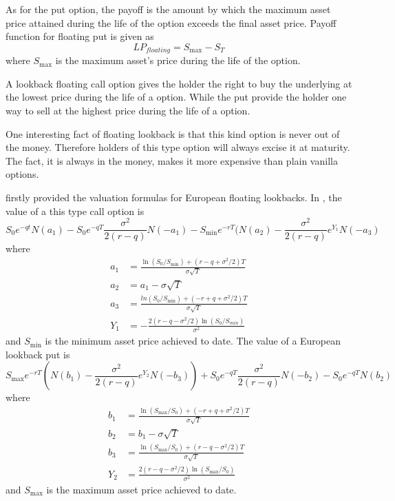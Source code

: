 \documentclass[11pt]{book}
\begin{document}
As for the put option, the payoff is the amount by which the maximum asset price attained during the life of the option exceeds the final asset price. Payoff function for floating put is given as
\begin{equation}
LP_{floating}=S_{\max}-S_T
\end{equation}
where $S_{\max}$ is the maximum asset's price during the life of the option. 

A lookback floating call option gives the holder the right to buy the underlying at the lowest price during the life of a option. While the put provide the holder one way to sell at the highest price during the life of a option. 

One interesting fact of floating lookback is that this kind option is never out of the money. Therefore holders of this type option will always excise it at maturity. The fact, it is always in the money, makes it more expensive than plain vanilla options. 

\cite{Goldman1979} firstly provided the valuation formulas for European floating lookbacks. In \cite{Hull2008}, the value of a this type call option is
\begin{equation}\label{eq:3}
S_0e^{-qt}N(a_1) - S_0 e^{-qT}\frac{\sigma ^2}{2(r-q)} N(-a_1) - S_{\min} e^{-rT}(N(a_2) - \frac{\sigma^2}{2(r-q)} e ^{Y_1} N(-a_3)
\end{equation}
where
\begin{equation}\label{eq:4}
\begin{split}
a_1 &=\frac{\ln(S_0 / S_{\min}) + (r-q+\sigma^2 /2)T}{\sigma \sqrt{T}}\\
a_2 &= a_1 - \sigma \sqrt{T}\\
a_3 &= \frac{ln(S_0 / S_{\min})+ (-r+q+\sigma^2 / 2)T}{\sigma \sqrt{T}}\\
Y_1 &= - \frac{2(r-q-\sigma^2 / 2) \ln(S_0 / S_{min})}{\sigma^2}
\end{split}
\end{equation}
and $S_{\min}$ is the minimum asset price achieved to date.
The value of a European lookback put is
\begin{equation}\label{eq:5}
S_{\max} e^{-rT} ( N(b_1) - \frac{\sigma^2}{2(r-q)} e^{Y_2} N(-b_3)) + S_0 e^{-qT}\frac{\sigma^2}{2(r-q)} N(-b_2) - S_0 e^{-qT} N(b_2)
\end{equation}
where
\begin{equation}\label{eq:6}
\begin{split}
b_1 &= \frac{\ln(S_{\max} / S_0) + (-r + q + \sigma^2 /2)T}{\sigma \sqrt{T}}\\
b_2 &= b_1 - \sigma \sqrt{T}\\
b_3 &= \frac{\ln(S_{\max} / S_0) + (r-q-\sigma^2 /2)T}{\sigma \sqrt{T}}\\
Y_2 &= \frac{2(r-q-\sigma^2 / 2) \ln(S_{\max} / S_0)}{\sigma^2}
\end{split}
\end{equation}
and $S_{\max}$ is the maximum asset price achieved to date.
\end{document}
